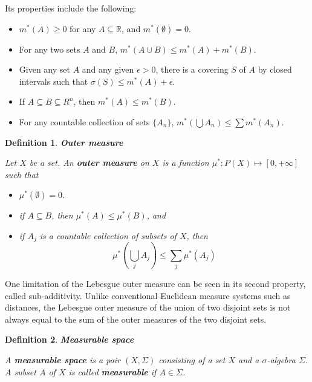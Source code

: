 \documentclass[12pt]{amsart}
\newtheorem{definition}{Definition}
\theoremstyle{plain}
\theoremstyle{definition}
\theoremstyle{remark}
\numberwithin{equation}{section}
\numberwithin{thm}{section}
\begin{document}
Its properties include the following:

\begin{itemize}
    \item $m^*(A) \geq 0$ for any $A \subseteq \mathbb{R}$, and $m^*(\emptyset) = 0$.
    \item For any two sets $A$ and $B$, $m^*(A \cup B) \leq m^*(A) + m^*(B)$.
    \item Given any set $A$ and any given $\epsilon > 0$, there is a covering $S$ of $A$ by closed intervals such that $\sigma(S) \leq m^*(A) + \epsilon$.
    \item If $A \subseteq B \subseteq R^n$, then $m^*(A) \leq m^*(B)$.
    \item For any countable collection of sets $\{A_n\}$,
    $m^*(\bigcup A_n) \leq \sum m^*(A_n)$.
\end{itemize}
\fi 


\begin{definition}
\textbf{Outer measure}

Let $X$ be a set. An \textbf{outer measure} on $X$ is a function $\mu^* : P(X) \mapsto [0,+\infty]$ such that 
\begin{itemize}
  \item [(i)] $\mu^*(\emptyset) = 0$.
  \item [(ii)] if $A \subseteq B$, then $\mu^*(A) \leq \mu^*(B)$, and
  \item [(iii)] if ${A_j}$ is a countable collection of subsets of $X$, then 
  \begin{equation*}
      \mu^*(\bigcup_j A_j ) \leq \sum_{j}\mu^*(A_j)
  \end{equation*}
\end{itemize} 
\end{definition}
One limitation of the Lebesgue outer measure can be seen in its second property, called sub-additivity. Unlike conventional Euclidean measure systems such as distances, the Lebesgue outer measure of the union of two disjoint sets is not always equal to the sum of the outer measures of the two disjoint sets.

\begin{definition}
\textbf{Measurable space}

    A \textbf{measurable space} is a pair $(X,\Sigma)$ consisting of a set $X$ and a $\sigma$-algebra $\Sigma$. A subset $A$ of $X$ is called \textbf{measurable} if $A \in \Sigma$.
\end{definition} 
\end{document}
